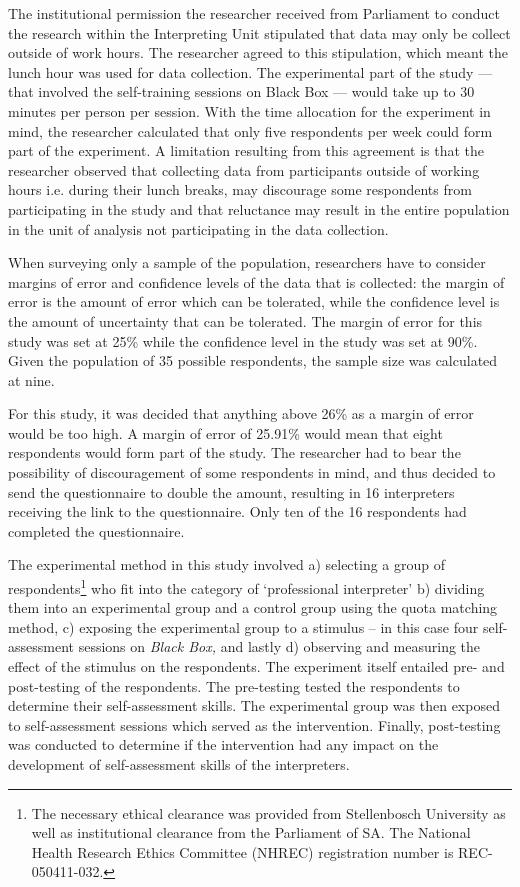 \documentclass[output=paper]{langsci/langscibook}
\begin{document}
The institutional permission the researcher received from Parliament to conduct the research within the Interpreting Unit stipulated that data may only be collect outside of work hours. The researcher agreed to this stipulation, which meant the lunch hour was used for data collection. The experimental part of the study — that involved the self-training sessions on Black Box — would take up to 30 minutes per person per session. With the time allocation for the experiment in mind, the researcher calculated that only five respondents per week could form part of the experiment. A limitation resulting from this agreement is that the researcher observed that collecting data from participants outside of working hours i.e. during their lunch breaks, may discourage some respondents from participating in the study and that reluctance may result in the entire population in the unit of analysis not participating in the data collection. 

When surveying only a sample of the population, researchers have to consider margins of error and confidence levels of the data that is collected: the margin of error is the amount of error which can be tolerated, while the confidence level is the amount of uncertainty that can be tolerated. The margin of error for this study was set at 25\% while the confidence level in the study was set at 90\%. Given the population of 35 possible respondents, the sample size was calculated at nine. 

For this study, it was decided that anything above 26\% as a margin of error would be too high. A margin of error of 25.91\% would mean that eight respondents would form part of the study. The researcher had to bear the possibility of discouragement of some respondents in mind, and thus decided to send the questionnaire to double the amount, resulting in 16 interpreters receiving the link to the questionnaire. Only ten of the 16 respondents had completed the questionnaire.

The experimental method in this study involved a) selecting a group of respondents\footnote{The necessary ethical clearance was provided from Stellenbosch University as well as institutional clearance from the Parliament of SA. The National Health Research Ethics Committee (NHREC) registration number is REC-050411-032.} who fit into the category of ‘professional interpreter’ b) dividing them into an experimental group and a control group using the quota matching method, c) exposing the experimental group to a stimulus – in this case four self-assessment sessions on \textit{Black Box,} and lastly d) observing and measuring the effect of the stimulus on the respondents. The experiment itself entailed pre- and post-testing of the respondents. The pre-testing tested the respondents to determine their self-assessment skills. The experimental group was then exposed to self-assessment sessions which served as the intervention. Finally, post-testing was conducted to determine if the intervention had any impact on the development of self-assessment skills of the interpreters. 
\end{document}
